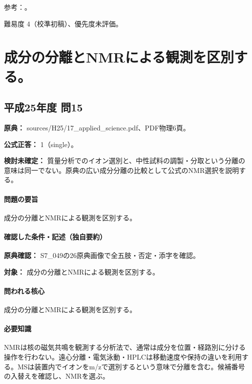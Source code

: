 \par 参考：\cite{analysis49_gpc_ref}。

\par 難易度 4（校準初稿）、優先度未評価。

\section{成分の分離とNMRによる観測を区別する。}

\subsection{平成25年度 問15}
\label{q:h25-reg-applied-15}

\noindent\textbf{原典：} sources/H25/17\_applied\_science.pdf、PDF物理6頁。

\textbf{公式正答：} 1（single）。

\par\textbf{検討未確定：} 質量分析でのイオン選別と、中性試料の調製・分取という分離の意味は同一でない。原典の広い成分分離の比較として公式のNMR選択を説明する。

\paragraph{問題の要旨} 成分の分離とNMRによる観測を区別する。

\paragraph{確認した条件・記述（独自要約）}\mbox{}\par

\noindent\textbf{原典確認：} S7\_049の26原典画像で全五肢・否定・添字を確認。\par

\noindent\textbf{対象：} 成分の分離とNMRによる観測を区別する。\par

\paragraph{問われる核心} 成分の分離とNMRによる観測を区別する。

\paragraph{必要知識} NMRは核の磁気共鳴を観測する分析法で、通常は成分を位置・経路別に分ける操作を行わない。遠心分離・電気泳動・HPLCは移動速度や保持の違いを利用する。MSは装置内でイオンをm/zで選別するという意味で分離を含む。候補番号の入替えを確認し、NMRを選ぶ。

